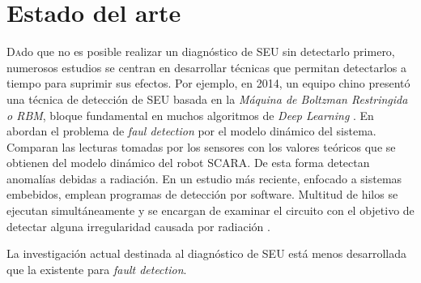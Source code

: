 \chapter{Estado del arte}
\label{ch:EstadoDelArte}

\lettrine[lraise=-0.1, lines=2, loversize=0.2]{D}{a}do que no es posible realizar
un diagnóstico de \gls{SEU} sin detectarlo primero, numerosos estudios se centran
en desarrollar técnicas que permitan detectarlos a tiempo para suprimir sus 
efectos. Por ejemplo, en 2014, un equipo chino presentó una técnica de detección 
de \gls{SEU} basada en la \textit{Máquina de Boltzman Restringida o \gls{RBM}}, 
bloque fundamental en muchos algoritmos de \textit{Deep Learning} 
\cite{RBMSEUdetection}. En \cite{SCARA} abordan el problema de \textit{faul 
detection} por el modelo dinámico del sistema. Comparan las lecturas tomadas por
los sensores con los valores teóricos que se obtienen del modelo dinámico del
robot SCARA. De esta forma detectan anomalías debidas a radiación. En un estudio
más reciente, enfocado a sistemas embebidos, emplean programas de detección por
software. Multitud de hilos se ejecutan simultáneamente y se encargan de examinar
el circuito con el objetivo de detectar alguna irregularidad causada por
radiación \cite{DetectingSEUs}.


La investigación actual destinada al diagnóstico de \gls{SEU} está menos
desarrollada que la existente para \textit{fault detection}.

    \cite{AFLS}










\endinput
